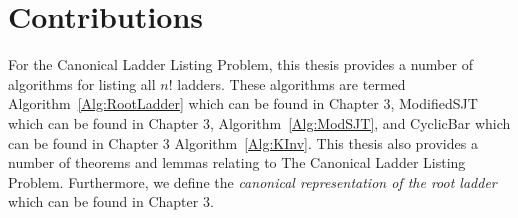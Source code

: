 
	

	

\section{Contributions}
	For the Canonical Ladder Listing Problem, this thesis provides 
	a number of algorithms for listing all $n!$ ladders. These algorithms are termed Algorithm~\ref{Alg:RootLadder} which 
	can be found in Chapter 3, {\sc ModifiedSJT} which 
	can be found in Chapter 3, Algorithm~\ref{Alg:ModSJT}, and {\sc CyclicBar} which can be found in Chapter 3 Algorithm~\ref{Alg:KInv}.
	This thesis also provides a number of theorems and lemmas relating to The Canonical Ladder Listing Problem. Furthermore, we define the 
	\emph{canonical representation of the root ladder} which can be found in Chapter 3.
	


